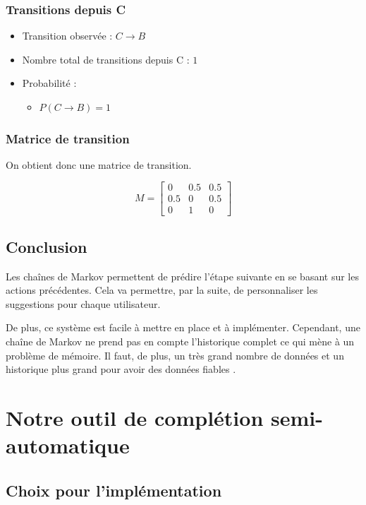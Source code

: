 \documentclass[a4paper, 11pt]{report}
\begin{document}
\subsection*{Transitions depuis C}
\begin{itemize}
	\item Transition observée : \( C \rightarrow B \)
	\item Nombre total de transitions depuis C : \(1\)
	\item Probabilité :
	      \begin{itemize}
		      \item \( P(C \rightarrow B) = 1 \)
	      \end{itemize}
\end{itemize}

\subsection*{Matrice de transition}
On obtient donc une matrice de transition.

\[
	M =
	\begin{bmatrix}
		0   & 0.5 & 0.5 \\
		0.5 & 0   & 0.5 \\
		0   & 1   & 0
	\end{bmatrix}
\]



\section{Conclusion}
Les chaînes de Markov permettent de prédire l'étape suivante en se basant sur les actions précédentes. Cela va permettre, par la suite, de personnaliser les suggestions pour chaque utilisateur. \par
De plus, ce système est facile à mettre en place et à implémenter. Cependant, une chaîne de Markov ne prend pas en compte l'historique complet ce qui mène à un problème de mémoire. Il faut, de plus, un très grand nombre de données et un historique plus grand pour avoir des données fiables .
\chapter{Notre outil de complétion semi-automatique}

\section{Choix pour l'implémentation}
\end{document}
